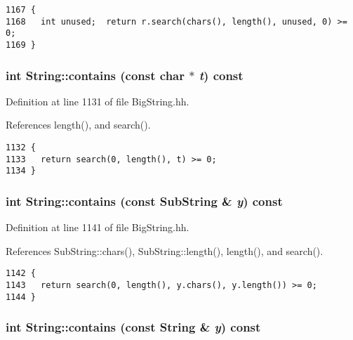 \footnotesize\begin{verbatim}1167 {
1168   int unused;  return r.search(chars(), length(), unused, 0) >= 0;
1169 }
\end{verbatim}\normalsize 
{}
\subsubsection{\setlength{\rightskip}{0pt plus 5cm}int String::contains (const char $\ast$ {\em t}) const\hspace{0.3cm}{\tt  [inline]}}\label{classString_a35}




Definition at line 1131 of file Big\-String.hh.

References length(), and search().



\footnotesize\begin{verbatim}1132 {   
1133   return search(0, length(), t) >= 0;
1134 }
\end{verbatim}\normalsize 
{}
\subsubsection{\setlength{\rightskip}{0pt plus 5cm}int String::contains (const {\bf Sub\-String} \& {\em y}) const\hspace{0.3cm}{\tt  [inline]}}\label{classString_a34}




Definition at line 1141 of file Big\-String.hh.

References Sub\-String::chars(), Sub\-String::length(), length(), and search().



\footnotesize\begin{verbatim}1142 {   
1143   return search(0, length(), y.chars(), y.length()) >= 0;
1144 }
\end{verbatim}\normalsize 
{}
\subsubsection{\setlength{\rightskip}{0pt plus 5cm}int String::contains (const String \& {\em y}) const\hspace{0.3cm}{\tt  [inline]}}\label{classString_a33}




